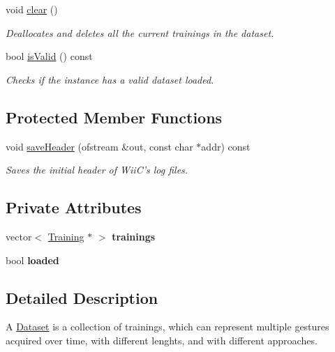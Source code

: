 \begin{DoxyCompactItemize}
void \hyperlink{class_dataset_a67744c3bdc87acd2a8189b9c4fbcd192}{clear} ()
\begin{DoxyCompactList}\small\item\em \-Deallocates and deletes all the current trainings in the dataset. \end{DoxyCompactList}\item 
bool \hyperlink{class_dataset_a51c528f515d44baee36589e8de11af50}{is\-Valid} () const 
\begin{DoxyCompactList}\small\item\em \-Checks if the instance has a valid dataset loaded. \end{DoxyCompactList}\end{DoxyCompactItemize}
\subsection*{\-Protected \-Member \-Functions}
\begin{DoxyCompactItemize}
\item 
void \hyperlink{class_dataset_a23110f7d2b6bc77a388e8dafee9772b3}{save\-Header} (ofstream \&out, const char $\ast$addr) const 
\begin{DoxyCompactList}\small\item\em \-Saves the initial header of \-Wii\-C's log files. \end{DoxyCompactList}\end{DoxyCompactItemize}
\subsection*{\-Private \-Attributes}
\begin{DoxyCompactItemize}
\item 
\hypertarget{class_dataset_a4491c33243fb10969489cc4c3e25de02}{vector$<$ \hyperlink{class_training}{\-Training} $\ast$ $>$ {\bfseries trainings}}\label{class_dataset_a4491c33243fb10969489cc4c3e25de02}

\item 
\hypertarget{class_dataset_a55ac9c41a1f3a2bc08ca053df147d163}{bool {\bfseries loaded}}\label{class_dataset_a55ac9c41a1f3a2bc08ca053df147d163}

\end{DoxyCompactItemize}


\subsection{\-Detailed \-Description}
\-A \hyperlink{class_dataset}{\-Dataset} is a collection of trainings, which can represent multiple gestures acquired over time, with different lenghts, and with different approaches. 

